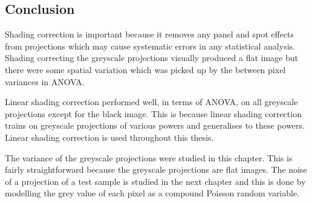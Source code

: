 \subsection{Conclusion}

Shading correction is important because it removes any panel and spot effects from projections which may cause systematic errors in any statistical analysis. Shading correcting the greyscale projections visually produced a flat image but there were some spatial variation which was picked up by the between pixel variances in ANOVA.

Linear shading correction performed well, in terms of ANOVA, on all greyscale projections except for the black image. This is because linear shading correction trains on greyscale projections of various powers and generalises to these powers. Linear shading correction is used throughout this thesis.

The variance of the greyscale projections were studied in this chapter. This is fairly straightforward because the greyscale projections are flat images. The noise of a projection of a test sample is studied in the next chapter and this is done by modelling the grey value of each pixel as a compound Poisson random variable.